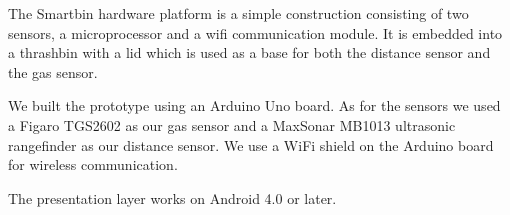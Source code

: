 The Smartbin hardware platform is a simple construction consisting of two sensors, a microprocessor and a wifi communication module. It is embedded into a thrashbin with a lid which is used
as a base for both the distance sensor and the gas sensor.

We built the prototype using an Arduino Uno board.
 As for the sensors we used a Figaro TGS2602 as our gas sensor and a MaxSonar MB1013 ultrasonic rangefinder as our distance sensor.
We use a WiFi shield on the Arduino board for wireless communication.

The presentation layer works on Android 4.0 or later.